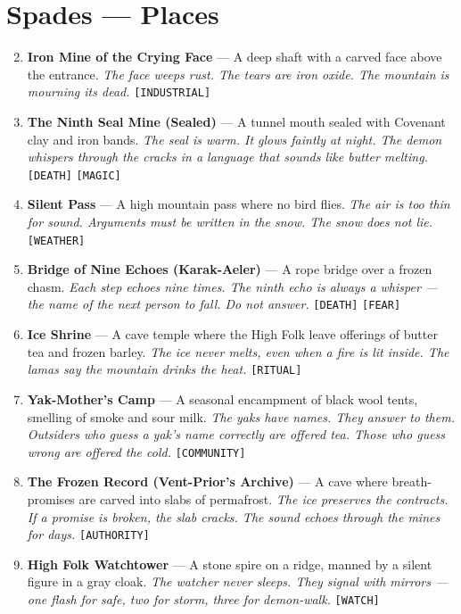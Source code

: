 \section*{Spades --- Places}
\label{sec:himadri-places}
\begin{enumerate}
\setcounter{enumi}{1}
\item \textbf{Iron Mine of the Crying Face} --- A deep shaft with a carved face above the entrance.
  \hfill \textit{The face weeps rust. The tears are iron oxide. The mountain is mourning its dead.} \texttt{[INDUSTRIAL]}
\item \textbf{The Ninth Seal Mine (Sealed)} --- A tunnel mouth sealed with Covenant clay and iron bands.
  \hfill \textit{The seal is warm. It glows faintly at night. The demon whispers through the cracks in a language that sounds like butter melting.} \texttt{[DEATH]} \texttt{[MAGIC]}
\item \textbf{Silent Pass} --- A high mountain pass where no bird flies.
  \hfill \textit{The air is too thin for sound. Arguments must be written in the snow. The snow does not lie.} \texttt{[WEATHER]}
\item \textbf{Bridge of Nine Echoes (Karak-Aeler)} --- A rope bridge over a frozen chasm.
  \hfill \textit{Each step echoes nine times. The ninth echo is always a whisper --- the name of the next person to fall. Do not answer.} \texttt{[DEATH]} \texttt{[FEAR]}
\item \textbf{Ice Shrine} --- A cave temple where the High Folk leave offerings of butter tea and frozen barley.
  \hfill \textit{The ice never melts, even when a fire is lit inside. The lamas say the mountain drinks the heat.} \texttt{[RITUAL]}
\item \textbf{Yak-Mother's Camp} --- A seasonal encampment of black wool tents, smelling of smoke and sour milk.
  \hfill \textit{The yaks have names. They answer to them. Outsiders who guess a yak's name correctly are offered tea. Those who guess wrong are offered the cold.} \texttt{[COMMUNITY]}
\item \textbf{The Frozen Record (Vent-Prior's Archive)} --- A cave where breath-promises are carved into slabs of permafrost.
  \hfill \textit{The ice preserves the contracts. If a promise is broken, the slab cracks. The sound echoes through the mines for days.} \texttt{[AUTHORITY]}
\item \textbf{High Folk Watchtower} --- A stone spire on a ridge, manned by a silent figure in a gray cloak.
  \hfill \textit{The watcher never sleeps. They signal with mirrors --- one flash for safe, two for storm, three for demon-walk.} \texttt{[WATCH]}

\end{enumerate}
